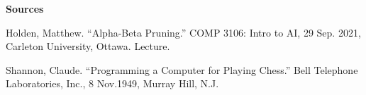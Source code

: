 \documentclass[12pt, letterpaper]{article}
\begin{document}
\bigskip
\bigskip
\bigskip

\textbf{Sources}

\medskip

Holden, Matthew. ``Alpha-Beta Pruning.'' COMP 3106: Intro to AI, 29 Sep. 2021, Carleton University, Ottawa. Lecture.

\medskip

Shannon, Claude. ``Programming a Computer for Playing Chess.'' Bell Telephone Laboratories, 
Inc., 8 Nov.1949, Murray Hill, N.J.


\end{document}
